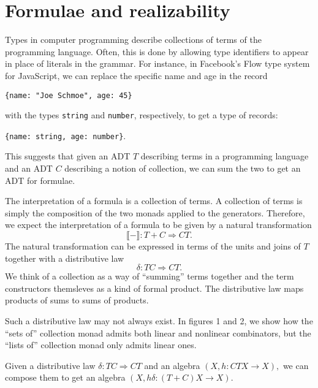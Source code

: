 \documentclass[sigplan,9pt,review,anonymous]{acmart}\settopmatter{printfolios=true,printccs=false,printacmref=false}
\newcommand{\maps}{\colon}
\newcommand{\interp}[1]{\llbracket #1 \rrbracket}
\begin{document}
\section{Formulae and realizability}

Types in computer programming describe collections of terms of the programming language.  Often, this is done by allowing type identifiers to appear in place of literals in the grammar.  For instance, in Facebook's Flow type system for JavaScript, we can replace the specific name and age in the record 
\begin{center}
  {\tt \{name: "Joe Schmoe", age: 45\}}
\end{center}
with the types {\tt string} and {\tt number}, respectively, to get a type of records:
\begin{center}
  {\tt \{name: string, age: number\}}.
\end{center}

This suggests that given an ADT $T$ describing terms in a programming language and an ADT $C$ describing a notion of collection, we can sum the two to get an ADT for formulae.  

The interpretation of a formula is a collection of terms.  A collection of terms is simply the composition of the two monads applied to the generators.  Therefore, we expect the interpretation of a formula to be given by a natural transformation
\[ \interp{-}\maps T+C \Rightarrow CT. \]
The natural transformation can be expressed in terms of the units and joins of $T$ together with a distributive law
\[ \delta\maps TC \Rightarrow CT. \]
We think of a collection as a way of ``summing'' terms together and the term constructors themsleves as a kind of formal product.  The distributive law maps products of sums to sums of products.

Such a distributive law may not always exist.  In figures 1 and 2, we show how the ``sets of'' collection monad admits both linear and nonlinear combinators, but the ``lists of'' collection monad only admits linear ones.

Given a distributive law $\delta\maps TC \Rightarrow CT$ and an algebra $(X, h\maps CTX \to X),$ we can compose them to get an algebra $(X, h\delta\maps (T+C)X \to X).$
\end{document}
